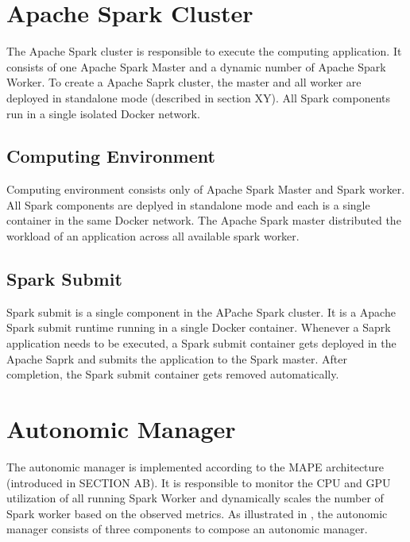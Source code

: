 \section{Apache Spark Cluster}
The Apache Spark cluster is responsible to execute the computing application. It consists of one Apache Spark Master and a dynamic number of Apache Spark Worker. To create a Apache Saprk cluster, the master and all worker are deployed in standalone mode (described in section XY).
All Spark components run in a single isolated Docker network.


\subsection{Computing Environment}
Computing environment consists only of Apache Spark Master and Spark worker. All Spark components are deplyed in standalone mode and each is a single container in the same Docker network. The Apache Spark master distributed the workload of an application across all available spark worker.

\subsection{Spark Submit}
Spark submit is a single component in the APache Spark cluster. It is a Apache Spark submit runtime running in a single Docker container. Whenever a Saprk application needs to be executed, a Spark submit container gets deployed in the Apache Saprk and submits the application to the Spark master. After completion, the Spark submit container gets removed automatically.


\section{Autonomic Manager}
The autonomic manager is implemented according to the MAPE architecture (introduced in SECTION AB). It is responsible to monitor the CPU and GPU utilization of all running Spark Worker and dynamically scales the number of Spark worker based on the observed metrics. As illustrated in , the autonomic manager consists of three components to compose an autonomic manager.


